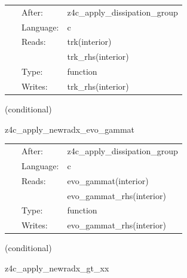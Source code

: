 \documentclass{article}
\begin{document}
\hspace{5mm}

 \begin{tabular*}{160mm}{cll} 
~ & After:  & z4c\_apply\_dissipation\_group \\ 
~ & Language:  & c \\ 
~ & Reads:  & trk(interior) \\ 
~& ~ &trk\_rhs(interior)\\ 
~ & Type:  & function \\ 
~ & Writes:  & trk\_rhs(interior) \\ 
\end{tabular*} 


\vspace{5mm}

   (conditional) 

\hspace{5mm} z4c\_apply\_newradx\_evo\_gammat 



\hspace{5mm}

 \begin{tabular*}{160mm}{cll} 
~ & After:  & z4c\_apply\_dissipation\_group \\ 
~ & Language:  & c \\ 
~ & Reads:  & evo\_gammat(interior) \\ 
~& ~ &evo\_gammat\_rhs(interior)\\ 
~ & Type:  & function \\ 
~ & Writes:  & evo\_gammat\_rhs(interior) \\ 
\end{tabular*} 


\vspace{5mm}

   (conditional) 

\hspace{5mm} z4c\_apply\_newradx\_gt\_xx 



\hspace{5mm}
\end{document}

